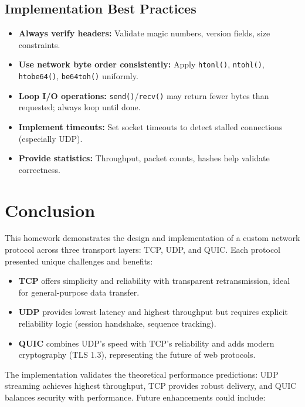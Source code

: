\documentclass[12pt,a4paper]{article}
\begin{document}
\subsection{Implementation Best Practices}

\begin{itemize}
  \item \textbf{Always verify headers:} Validate magic numbers, version fields, size constraints.
  \item \textbf{Use network byte order consistently:} Apply \texttt{htonl()}, \texttt{ntohl()}, \texttt{htobe64()}, \texttt{be64toh()} uniformly.
  \item \textbf{Loop I/O operations:} \texttt{send()}/\texttt{recv()} may return fewer bytes than requested; always loop until done.
  \item \textbf{Implement timeouts:} Set socket timeouts to detect stalled connections (especially UDP).
  \item \textbf{Provide statistics:} Throughput, packet counts, hashes help validate correctness.
\end{itemize}

\section{Conclusion}
\label{sec:conclusion}

This homework demonstrates the design and implementation of a custom network protocol across three transport layers: TCP, UDP, and QUIC. Each protocol presented unique challenges and benefits:

\begin{itemize}
  \item \textbf{TCP} offers simplicity and reliability with transparent retransmission, ideal for general-purpose data transfer.
  \item \textbf{UDP} provides lowest latency and highest throughput but requires explicit reliability logic (session handshake, sequence tracking).
  \item \textbf{QUIC} combines UDP's speed with TCP's reliability and adds modern cryptography (TLS 1.3), representing the future of web protocols.
\end{itemize}

The implementation validates the theoretical performance predictions: UDP streaming achieves highest throughput, TCP provides robust delivery, and QUIC balances security with performance. Future enhancements could include:
\end{document}
